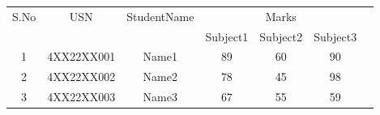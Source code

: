 \documentclass{article}
\begin{document}
\begin{tabular}{|c|c|c|c|c|c|c|}
\hline
S.No & USN & StudentName & \multicolumn{3}{c|}{Marks} \\
\cline{3-6}
 & & & Subject1 & Subject2 & Subject3 \\
\hline
1 & 4XX22XX001 & Name1 & 89 & 60 & 90 \\
\hline
2 & 4XX22XX002 & Name2 & 78 & 45 & 98 \\
\hline
3 & 4XX22XX003 & Name3 & 67 & 55 & 59 \\
\hline
\end{tabular}
\end{document}
